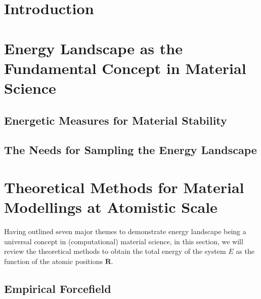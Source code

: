 \documentclass[%
aip,
rmp,
10pt, 
amsmath,
amssymb,
floatfix,
nofootinbib,
]{revtex4-2}
\renewcommand{\bm}[1]{\mathbf{#1}}
\begin{document}
\begin{abstract}
artificial intelligence, and outlines future directions toward physics-informed, efficient, and reliable computational materials discovery.
\end{abstract}	
\maketitle


\tableofcontents

%
%
\section{Introduction}


\section{Energy Landscape as the Fundamental Concept in Material Science}
\label{chapter:energy_landscape_concept}
 

\subsection{Energetic Measures for Material Stability}
\subsection{The Needs for Sampling the Energy Landscape} 
\label{sect:sampling_examples}

 
\section{Theoretical Methods for Material Modellings at Atomistic Scale}\label{chapter:energy_models}
Having outlined seven major themes to demonstrate energy landscape being a universal concept in (computational) material science, in this section, we will review the theoretical methods to obtain the total energy of the system $E$ as the function of the atomic positions $\bm{R}$.  

\subsection{Empirical Forcefield}
\label{sect:empirical_forcefield}

\end{document}
